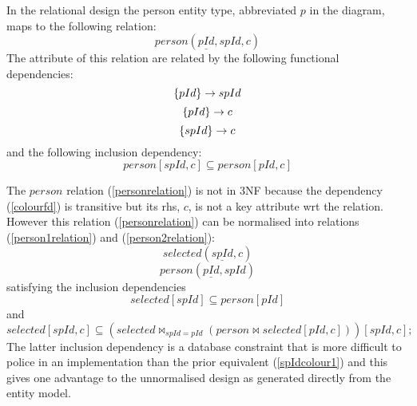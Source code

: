 In the relational design the person entity type, abbreviated $p$ in the diagram, maps to the following relation:
\begin{equation}
\label{personrelation}
person(\underline{pId}, spId, c)
\end{equation}
The  attribute of this relation are related by the following  functional dependencies:
\begin{equation}
\left\{pId\right\} \rightarrow spId
\end{equation}
\begin{equation}
\label{colourfd}
\left\{pId\right\} \rightarrow c
\end{equation}
\begin{equation}
\left\{spId\right\} \rightarrow c
\end{equation}
and the following  inclusion dependency:
\begin{equation}
\label{spIdcolour1}
person[spId,c] \subseteq person[pId,c]
\end{equation}

The $person$ relation (\ref{personrelation}) is not in 3NF because the dependency (\ref{colourfd}) is transitive but its rhs, $c$, is not a key attribute wrt the relation. However this
relation (\ref{personrelation}) can be normalised into relations (\ref{person1relation}) and (\ref{person2relation}):
\begin{equation}
\label{person1relation}
selected(\underline{spId},  c)
\end{equation}
\begin{equation}
\label{person2relation}
person(\underline{pId}, spId)
\end{equation}
satisfying the inclusion dependencies
\begin{equation}
selected[spId] \subseteq person[pId]
\end{equation}
and
\begin{equation}
\label{spIdcolour}
selected[spId,c] \subseteq (selected \bowtie_{spId=pId} 
                                       (person \bowtie selected [pId,c]) )
																			[spId,c];
\end{equation}
The latter inclusion dependency is a database constraint that
is more difficult to police in an implementation
than the prior equivalent (\ref{spIdcolour1}) and
this gives one advantage to the unnormalised design as generated
directly from the entity model. 




